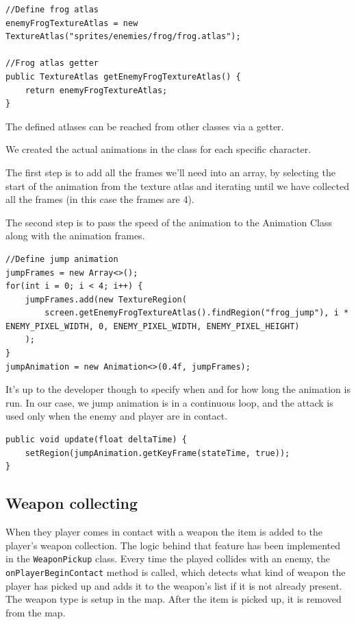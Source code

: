 \documentclass[12p]{article}
\begin{document}
\begin{verbatim}
//Define frog atlas
enemyFrogTextureAtlas = new TextureAtlas("sprites/enemies/frog/frog.atlas");

//Frog atlas getter
public TextureAtlas getEnemyFrogTextureAtlas() {
    return enemyFrogTextureAtlas;
}
\end{verbatim}

The defined atlases can be reached from other classes via a getter.

We created the actual animations in the class for each specific character. 

The first step is to add all the frames we'll need into an array, by selecting the start of the animation from the texture atlas and iterating until we have collected all the frames (in this case the frames are 4).

The second step is to pass the speed of the animation to the Animation Class along with the animation frames.

\begin{verbatim}
//Define jump animation
jumpFrames = new Array<>();
for(int i = 0; i < 4; i++) {
    jumpFrames.add(new TextureRegion(
        screen.getEnemyFrogTextureAtlas().findRegion("frog_jump"), i * ENEMY_PIXEL_WIDTH, 0, ENEMY_PIXEL_WIDTH, ENEMY_PIXEL_HEIGHT)
    );
}
jumpAnimation = new Animation<>(0.4f, jumpFrames);
\end{verbatim}

It's up to the developer though to specify when and for how long the animation is run. In our case, we jump animation is in a continuous loop, and the attack is used only when the enemy and player are in contact.

\begin{verbatim}
public void update(float deltaTime) {
    setRegion(jumpAnimation.getKeyFrame(stateTime, true));
}
\end{verbatim}


\subsection{Weapon collecting} \label{DocWeaponCollection}

When they player comes in contact with a weapon the item is added to the player's weapon collection. The logic behind that feature has been implemented in the \texttt{WeaponPickup} class. Every time the played collides with an enemy, the \texttt{onPlayerBeginContact} method is called, which detects what kind of weapon the player has picked up and adds it to the weapon's list if it is not already present. The weapon type is setup in the map. After the item is picked up, it is removed from the map.
\end{document}
